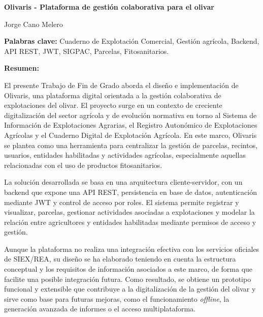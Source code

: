\newpage
\begin{center}
    {\large \textbf{Olivaris - Plataforma de gestión colaborativa para el olivar}}
    
    \vspace{0.3cm}
    {\normalsize Jorge Cano Melero} 
    
    \vspace{0.3cm}
\end{center}

\vspace{0.5cm}

\textbf{Palabras clave:} Cuaderno de Explotación Comercial, Gestión agrícola, Backend, API REST, JWT, SIGPAC, Parcelas, Fitosanitarios.

\vspace{0.5cm}

\textbf{Resumen:}

El presente Trabajo de Fin de Grado aborda el diseño e implementación de Olivaris, una plataforma digital orientada a la gestión colaborativa de explotaciones del olivar. El
proyecto surge en un contexto de creciente digitalización del sector agrícola y de evolución normativa en torno al Sistema de Información de Explotaciones Agrarias, el Registro
Autonómico de Explotaciones Agrícolas y el Cuaderno Digital de Explotación Agrícola. En este marco, Olivaris se plantea como una herramienta para centralizar la gestión de parcelas,
recintos, usuarios, entidades habilitadas y actividades agrícolas, especialmente aquellas relacionadas con el uso de productos fitosanitarios.

La solución desarrollada se basa en una arquitectura cliente-servidor, con un backend que expone una API REST, persistencia en base de datos, autenticación mediante JWT y control de
acceso por roles. El sistema permite registrar y visualizar, parcelas, gestionar actividades asociadas a explotaciones y modelar la relación entre agricultores y entidades habilitadas
mediante permisos de acceso y gestión.

Aunque la plataforma no realiza una integración efectiva con los servicios oficiales de SIEX/REA, su diseño se ha elaborado teniendo en cuenta la estructura conceptual y los requisitos de
información asociados a este marco, de forma que facilite una posible integración futura. Como resultado, se obtiene un prototipo funcional y extensible que contribuye a la digitalización
de la gestión del olivar y sirve como base para futuras mejoras, como el funcionamiento \textit{offline}, la generación avanzada de informes o el acceso multiplataforma. 